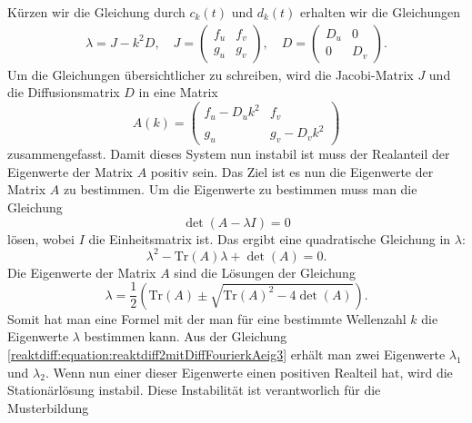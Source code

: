 Kürzen wir die Gleichung durch \(c_k(t)\) und \(d_k(t)\) erhalten wir die Gleichungen
\begin{align}
    \label{reaktdiff:equation:reaktdiff2mitDiffFourierk}
    \lambda = J - k^2 D, \quad 
    J =
    \begin{pmatrix}
        f_u & f_v\\
        g_u & g_v
    \end{pmatrix}, \quad
    D =
    \begin{pmatrix}
        D_u & 0\\
        0 & D_v
    \end{pmatrix}.
\end{align}
Um die Gleichungen übersichtlicher zu schreiben, wird die Jacobi-Matrix \(J\) und die Diffusionsmatrix \(D\) in eine Matrix
\begin{equation}
    \label{reaktdiff:equation:reaktdiff2mitDiffFourierkA}
    A(k) =
    \begin{pmatrix}
        f_u - D_u k^2 & f_v\\
        g_u & g_v - D_v k^2
    \end{pmatrix}
\end{equation}
zusammengefasst.
Damit dieses System nun instabil ist muss der Realanteil der Eigenwerte der Matrix \(A\) positiv sein.
Das Ziel ist es nun die Eigenwerte der Matrix \(A\) zu bestimmen.
Um die Eigenwerte zu bestimmen muss man die Gleichung
\begin{equation}
    \det(A - \lambda I) = 0
\label{reaktdiff:equation:reaktdiff2mitDiffFourierkAeig}
\end{equation}
lösen, wobei \(I\) die Einheitsmatrix ist.
Das ergibt eine quadratische Gleichung in \(\lambda\):
\begin{equation}
    \lambda^2 - \text{Tr}(A) \lambda + \det(A) = 0.
\label{reaktdiff:equation:reaktdiff2mitDiffFourierkAeig2}
\end{equation}
Die Eigenwerte der Matrix \(A\) sind die Lösungen der Gleichung
\begin{equation}
    \lambda = \frac{1}{2} \left( \text{Tr}(A) \pm 
    \sqrt{\text{Tr}(A)^2 - 4 \det(A)} \right).
\label{reaktdiff:equation:reaktdiff2mitDiffFourierkAeig3}
\end{equation}
Somit hat man eine Formel mit der man für eine bestimmte Wellenzahl \(k\) die Eigenwerte \(\lambda\) bestimmen kann.
Aus der Gleichung \ref{reaktdiff:equation:reaktdiff2mitDiffFourierkAeig3} erhält man zwei Eigenwerte \(\lambda_1\) und \(\lambda_2\).
Wenn nun einer dieser Eigenwerte einen positiven Realteil hat, wird die Stationärlösung instabil.
Diese Instabilität ist verantworlich für die Musterbildung


